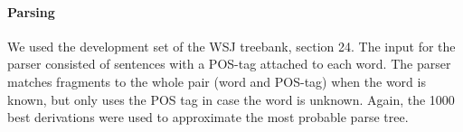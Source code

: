 \paragraph{Parsing}
We used the development set of the WSJ treebank, section 24. The input for the parser consisted of sentences with a POS-tag attached to each word. The parser matches fragments to the whole pair (word and POS-tag) when the word is known, but only uses the POS tag in case the word is unknown. Again, the 1000 best derivations were used to approximate the most probable parse tree.






